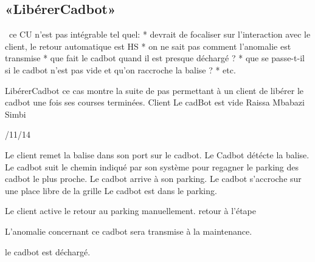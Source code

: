 \subsection{«LibérerCadbot»}
\TODO\ ce CU n'est pas intégrable tel quel: 
* devrait de focaliser sur l'interaction avec le client, le retour automatique est HS
* on ne sait pas comment l'anomalie est transmise
* que fait le cadbot quand il est presque déchargé ?
* que se passe-t-il si le cadbot n'est pas vide et qu'on raccroche la balise ?
* etc.

\startCU
\nom LibérerCadbot
\but  ce cas montre la suite de pas permettant à un client de libérer le cadbot une fois ses courses terminées.
\acteur Client
\precondition Le cadBot est vide
\auteur Raissa Mbabazi Simbi
\date 7/11/14

\nominal %
\startnominal
\etape[LC:SA1] Le client remet la balise dans son port sur le cadbot. 
\etape Le Cadbot détécte la balise.
\etape[LC:RETOUR] Le cadbot suit le chemin indiqué par son système pour regagner le parking des cadbot le plus proche.
\etape Le cadbot arrive à son parking.
\etape Le cadbot s'accroche sur une place libre de la grille 
\stopnominal
\postcondition Le cadbot est dans le parking.

\alternatifs
\startalternatif[LC:SA1] %
  \etape Le client active le retour au parking manuellement.
	\etape retour à l'étape \in[LC:RETOUR]

\stopcondition
\postcondition L'anomalie concernant ce cadbot sera transmise à la maintenance.
\stopalternatif



\exception
le cadbot est déchargé.
\stopCU
